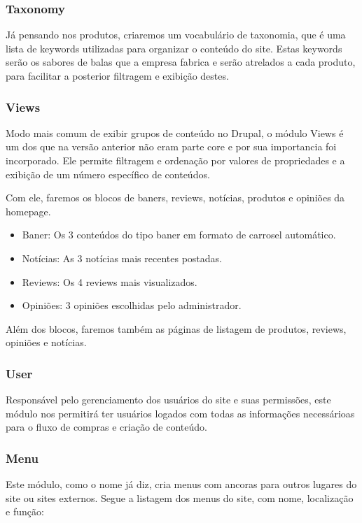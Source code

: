 \documentclass[
	12pt,				%
    oneside,			%
	a4paper,			%
	english,			%
	french,				%
	spanish,			%
	brazil				%
	]{abntex2}
\begin{document}
\subsubsection{Taxonomy}
Já pensando nos produtos, criaremos um vocabulário de taxonomia, que é uma lista de keywords utilizadas para organizar o conteúdo do site. Estas keywords serão os sabores de balas que a empresa fabrica e serão atrelados a cada produto, para facilitar a posterior filtragem e exibição destes.

\subsubsection{Views}
Modo mais comum de exibir grupos de conteúdo no Drupal, o módulo Views é um dos que na versão anterior não eram parte core e por sua importancia foi incorporado. Ele permite filtragem e ordenação por valores de propriedades e a exibição de um número específico de conteúdos. 

Com ele, faremos os blocos de baners, reviews, notícias, produtos e opiniões da homepage.
\begin{itemize}
  \item Baner: Os 3 conteúdos do tipo baner em formato de carrosel automático.
  \item Notícias: As 3 notícias mais recentes postadas.
  \item Reviews: Os 4 reviews mais visualizados.
  \item Opiniões: 3 opiniões escolhidas pelo administrador.
\end{itemize}

Além dos blocos, faremos também as páginas de listagem de produtos, reviews, opiniões e notícias.

\subsubsection{User}
Responsável pelo gerenciamento dos usuários do site e suas permissões, este módulo nos permitirá ter usuários logados com todas as informações necessárioas para o fluxo de compras e criação de conteúdo.

\subsubsection{Menu}
Este módulo, como o nome já diz, cria menus com ancoras para outros lugares do site ou sites externos. Segue a listagem dos menus do site, com nome, localização e função:
\end{document}

